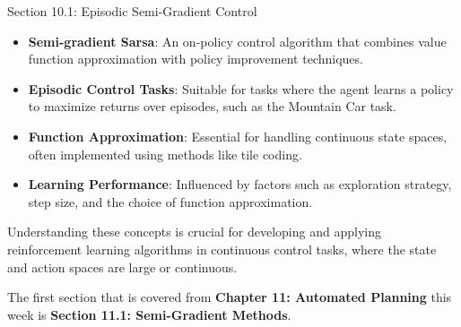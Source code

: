 \begin{notes}{Section 10.1: Episodic Semi-Gradient Control}
\begin{highlight}
    \end{highlight}
    
    \begin{highlight}
    
        \begin{itemize}
            \item \textbf{Semi-gradient Sarsa}: An on-policy control algorithm that combines value function approximation with policy improvement techniques.
            \item \textbf{Episodic Control Tasks}: Suitable for tasks where the agent learns a policy to maximize returns over episodes, such as the Mountain Car task.
            \item \textbf{Function Approximation}: Essential for handling continuous state spaces, often implemented using methods like tile coding.
            \item \textbf{Learning Performance}: Influenced by factors such as exploration strategy, step size, and the choice of function approximation.
        \end{itemize}
    
        Understanding these concepts is crucial for developing and applying reinforcement learning algorithms in continuous control tasks, where the state and action spaces are large or continuous.
    
    \end{highlight}
\end{notes}

The first section that is covered from \textbf{Chapter 11: Automated Planning} this week is \textbf{Section 11.1: Semi-Gradient Methods}.

